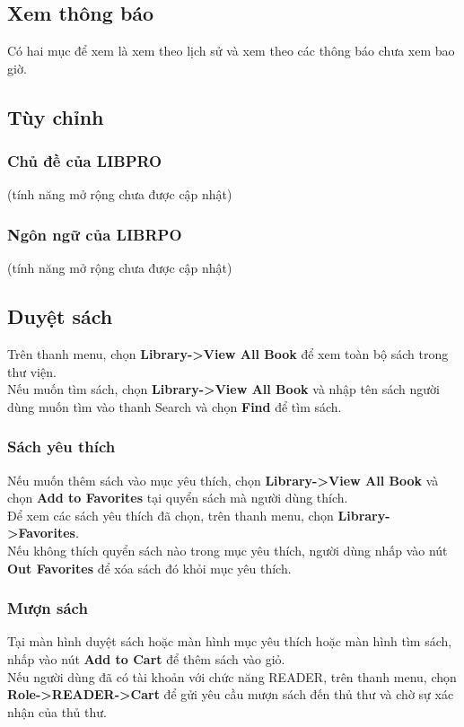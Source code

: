 \documentclass[12pt,a4paper]{report}
\begin{document}
        \subsection{Xem thông báo}
            Có hai mục để xem là xem theo lịch sử và xem theo các thông báo chưa xem bao giờ.\\
        \subsection{Tùy chỉnh}
            \subsubsection{Chủ đề của LIBPRO} (tính năng mở rộng chưa được cập nhật)\\
            \subsubsection{Ngôn ngữ của LIBRPO} (tính năng mở rộng chưa được cập nhật)\\
        \subsection{Duyệt sách}
        Trên thanh menu, chọn \textbf{Library->View All Book} để xem toàn bộ sách trong thư viện.\\
        Nếu muốn tìm sách, chọn \textbf{Library->View All Book} và nhập tên sách người dùng muốn tìm vào thanh Search và chọn \textbf{Find} để tìm sách.\\
            \subsubsection{Sách yêu thích}
            Nếu muốn thêm sách vào mục yêu thích, chọn \textbf{Library->View All Book} và chọn \textbf{Add to Favorites} tại quyển sách mà người dùng thích.\\
            Để xem các sách yêu thích đã chọn, trên thanh menu, chọn \textbf{Library->Favorites}.\\
            Nếu không thích quyển sách nào trong mục yêu thích, người dùng nhấp vào nút \textbf{Out Favorites} để xóa sách đó khỏi mục yêu thích.\\
            \subsubsection{Mượn sách}
            Tại màn hình duyệt sách hoặc màn hình mục yêu thích hoặc màn hình tìm sách, nhấp vào nút \textbf{Add to Cart} để thêm sách vào giỏ.\\
            Nếu người dùng đã có tài khoản với chức năng READER, trên thanh menu, chọn \textbf{Role->READER->Cart} để gửi yêu cầu mượn sách đến thủ thư và chờ sự xác nhận của thủ thư.\\
\end{document}
